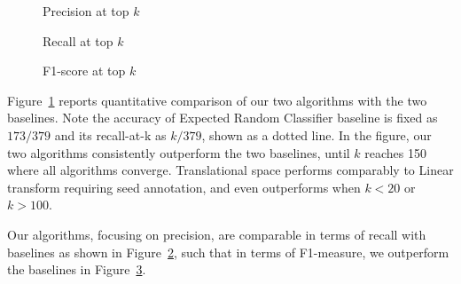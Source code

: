 \begin{figure*}[th]
\label{fig:atk}
\begin{subfigure}{0.67\columnwidth}
	\resizebox{\columnwidth}{!}{}
	\caption{Precision at top $k$}
	\label{fig:precisionatk}
\end{subfigure}
\hfill
\begin{subfigure}{0.67\columnwidth}
	\resizebox{\columnwidth}{!}{}
	\caption{Recall at top $k$}
	\label{fig:recallatk}
\end{subfigure}
\hfill
\begin{subfigure}{0.67\columnwidth}
	\resizebox{\columnwidth}{!}{}
	\caption{F1-score at top $k$}
	\label{fig:f1atk}

\end{subfigure}
\caption{The precision, recall and F1-score at top k of the 4 methods. (ER=Expected Random, PR=Popularity Ranking, LT=Linear Transform, TS=Translation Space)}
\end{figure*}

Figure~\ref{fig:precisionatk} reports quantitative comparison of our two algorithms with the two baselines.
Note the accuracy of
 Expected Random Classifier baseline is fixed as  $173/379$ and its recall-at-k as $k/379$, shown as a dotted line.
In the figure, our two algorithms consistently outperform the two baselines, until $k$ reaches 150 where all algorithms converge.
Translational space performs comparably to Linear transform requiring seed annotation, and even outperforms when $k<20$ or $k>100$.


Our algorithms, focusing on precision, are comparable in terms of recall with baselines as shown in
Figure~\ref{fig:recallatk},
such that in terms of F1-measure, we outperform the baselines in
Figure~\ref{fig:f1atk}. %


